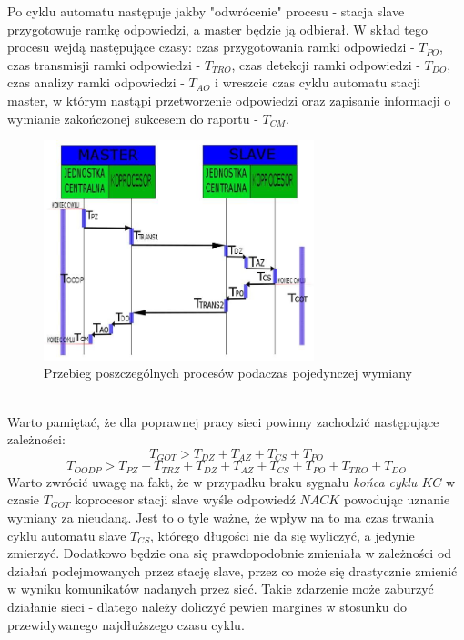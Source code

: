 	Po cyklu automatu następuje jakby "odwrócenie" procesu - stacja slave przygotowuje ramkę odpowiedzi, a master będzie ją odbierał. W skład tego procesu wejdą następujące czasy: czas przygotowania ramki odpowiedzi - $ T_{PO} $, czas transmisji ramki odpowiedzi - $ T_{TRO} $, czas detekcji ramki odpowiedzi - $ T_{DO} $, czas analizy ramki odpowiedzi - $ T_{AO} $ i wreszcie czas cyklu automatu stacji master, w którym nastąpi przetworzenie odpowiedzi oraz zapisanie informacji o wymianie zakończonej sukcesem do raportu - $ T_{CM} $.\\
	\begin{figure}[h]
		\centering
		\includegraphics[width=0.7\textwidth]{./img/wymiana.jpg}
		\caption{Przebieg poszczególnych procesów podaczas pojedynczej wymiany}
		\label{fig:wymiana}
	\end{figure}
	\\
	Warto pamiętać, że dla poprawnej pracy sieci powinny zachodzić następujące zależności:
	\begin{equation}
		\label{eq:zalTgot}
		T_{GOT} > T_{DZ} + T_{AZ} + T_{CS} + T_{PO}
	\end{equation}
	\begin{equation}
		\label{eq:zalToodp}
		T_{OODP} > T_{PZ} + T_{TRZ} + T_{DZ} + T_{AZ} + T_{CS} + T_{PO} + T_{TRO} + T_{DO}
	\end{equation}
	Warto zwrócić uwagę na fakt, że w przypadku braku sygnału \textit{końca cyklu $ KC $} w czasie $ T_{GOT} $ koprocesor stacji slave wyśle odpowiedź $ NACK $ powodując uznanie wymiany za nieudaną. Jest to o tyle ważne, że wpływ na to ma czas trwania cyklu automatu slave $ T_{CS} $, którego długości nie da się wyliczyć, a jedynie zmierzyć. Dodatkowo będzie ona się prawdopodobnie zmieniała w zależności od działań podejmowanych przez stację slave, przez co może się drastycznie zmienić w wyniku komunikatów nadanych przez sieć. Takie zdarzenie może zaburzyć działanie sieci - dlatego należy doliczyć pewien margines w stosunku do przewidywanego najdłuższego czasu cyklu.
	

